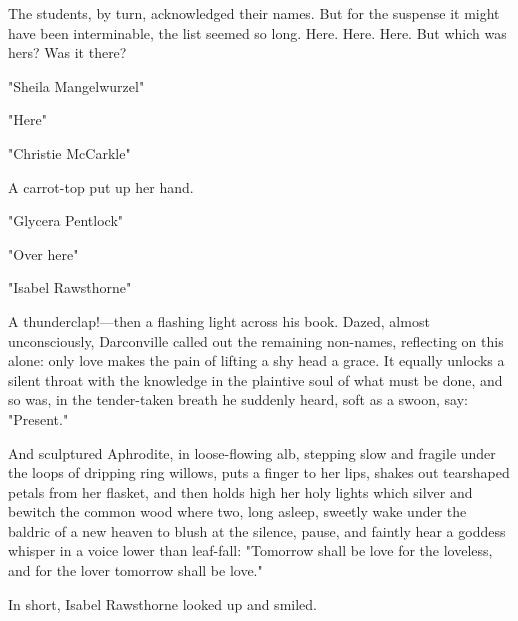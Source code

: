   The students, by turn, acknowledged their names. But for the suspense it might
have been interminable, the list seemed so long. Here. Here. Here. But which was
hers? Was it there?

  "Sheila Mangelwurzel"

  "Here"

  "Christie McCarkle"

  A carrot-top put up her hand.

  "Glycera Pentlock"

  "Over here"

  "Isabel Rawsthorne"

  A thunderclap!---then a flashing light across his book. Dazed, almost
unconsciously, Darconville called out the remaining non-names, reflecting on
this alone: only love makes the pain of lifting a shy head a grace. It equally
unlocks a silent throat with the knowledge in the plaintive 
soul of what must be done, and so was, in the tender-taken breath he suddenly 
heard, soft as a swoon,
say: "Present."

  And sculptured Aphrodite, in loose-flowing alb,
stepping slow and fragile under the loops of dripping ring willows, 
puts a finger to her lips, shakes out tearshaped petals 
from her flasket, 
and then holds high her holy lights which silver 
and bewitch the common wood where two, long asleep, sweetly wake under the baldric 
of a new heaven to blush at the silence, pause, and faintly hear a
goddess whisper in a voice lower than leaf-fall: "Tomorrow shall be love for the
loveless, and for the lover tomorrow shall be love."

  In short, Isabel Rawsthorne looked up and smiled.
 
